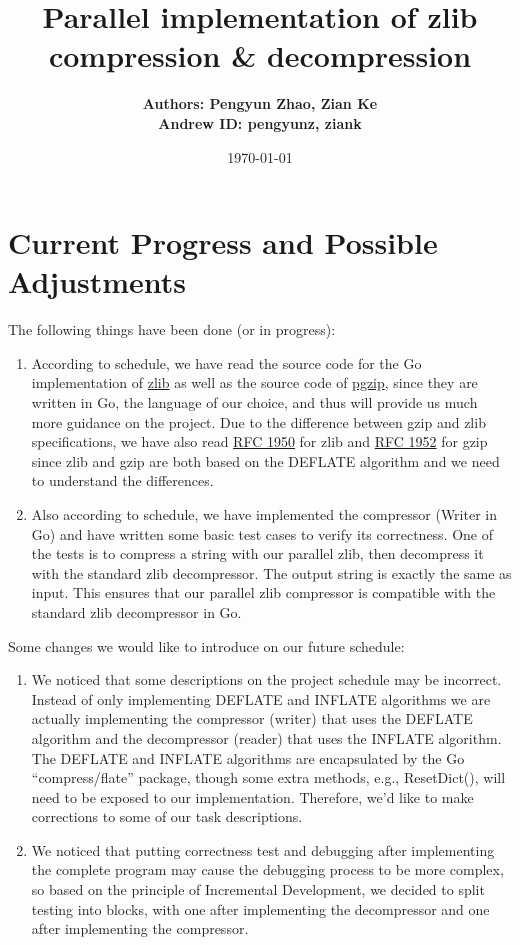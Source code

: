 \documentclass{article}
\title{Parallel implementation of zlib compression \& decompression}
\author{\textbf{Authors: Pengyun Zhao, Zian Ke}\\\textbf{Andrew ID: pengyunz, ziank}}
\date{\today}
\begin{document}
\maketitle

\section{Current Progress and Possible Adjustments}
The following things have been done (or in progress):
\begin{enumerate}[(1)]
    \item According to schedule, we have read the source code for the Go implementation of \href{https://github.com/golang/go/tree/master/src/compress/zlib}{zlib} as well as the source code of \href{https://github.com/klauspost/pgzip}{pgzip}, since they are written in Go, the language of our choice, and thus will provide us much more guidance on the project. Due to the difference between gzip and zlib specifications, we have also read \href{https://tools.ietf.org/html/rfc1950}{RFC 1950} for zlib and \href{https://tools.ietf.org/html/rfc1952}{RFC 1952} for gzip since zlib and gzip are both based on the DEFLATE algorithm and we need to understand the differences.
    \item Also according to schedule, we have implemented the compressor (Writer in Go) and have written some basic test cases to verify its correctness. One of the tests is to compress a string with our parallel zlib, then decompress it with the standard zlib decompressor. The output string is exactly the same as input. This ensures that our parallel zlib compressor is compatible with the standard zlib decompressor in Go. 
\end{enumerate}
Some changes we would like to introduce on our future schedule:
\begin{enumerate}[(1)]
    \item We noticed that some descriptions on the project schedule may be incorrect. Instead of only implementing DEFLATE and INFLATE algorithms we are actually implementing the compressor (writer) that uses the DEFLATE algorithm and the decompressor (reader) that uses the INFLATE algorithm. The DEFLATE and INFLATE algorithms are encapsulated by the Go ``compress/flate'' package, though some extra methods, e.g., ResetDict(), will need to be exposed to our implementation. Therefore, we'd like to make corrections to some of our task descriptions.
    \item We noticed that putting correctness test and debugging after implementing the complete program may cause the debugging process to be more complex, so based on the principle of Incremental Development, we decided to split testing into blocks, with one after implementing the decompressor and one after implementing the compressor.
\end{enumerate}
\end{document}
